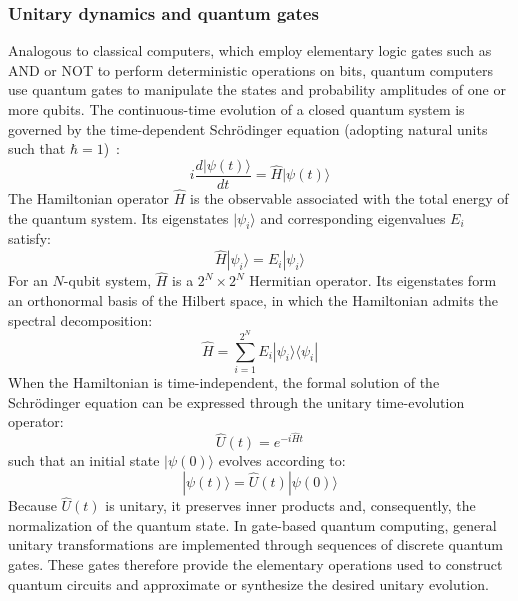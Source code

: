 \subsubsection{Unitary dynamics and quantum gates}
Analogous to classical computers, which employ elementary logic gates such as AND or NOT to perform deterministic operations on bits, quantum computers use quantum gates to manipulate the states and probability amplitudes of one or more qubits. The continuous-time evolution of a closed quantum system is governed by the time-dependent Schrödinger equation (adopting natural units such that $\hbar=1$)~\cite{nielsen2010quantum}:
\begin{equation}
i\frac{d|\psi(t)\rangle}{dt}=\hat{H}|\psi(t)\rangle
\end{equation}
The Hamiltonian operator $\hat{H}$ is the observable associated with the total energy of the quantum system. Its eigenstates $|\psi_i\rangle$ and corresponding eigenvalues $E_i$ satisfy:
\begin{equation}
\hat{H}|\psi_i\rangle=E_i|\psi_i\rangle
\end{equation}
For an $N$-qubit system, $\hat{H}$ is a $2^N\times2^N$ Hermitian operator. Its eigenstates form an orthonormal basis of the Hilbert space, in which the Hamiltonian admits the spectral decomposition:
\begin{equation}
\hat{H}=\sum_{i=1}^{2^N}E_i|\psi_i\rangle\langle\psi_i|
\end{equation}
When the Hamiltonian is time-independent, the formal solution of the Schrödinger equation can be expressed through the unitary time-evolution operator:
\begin{equation}
\hat{U}(t)=e^{-i\hat{H}t}
\end{equation}
such that an initial state $|\psi(0)\rangle$ evolves according to:
\begin{equation}
|\psi(t)\rangle=\hat{U}(t)|\psi(0)\rangle
\end{equation}
Because $\hat{U}(t)$ is unitary, it preserves inner products and, consequently, the normalization of the quantum state. In gate-based quantum computing, general unitary transformations are implemented through sequences of discrete quantum gates. These gates therefore provide the elementary operations used to construct quantum circuits and approximate or synthesize the desired unitary evolution.

